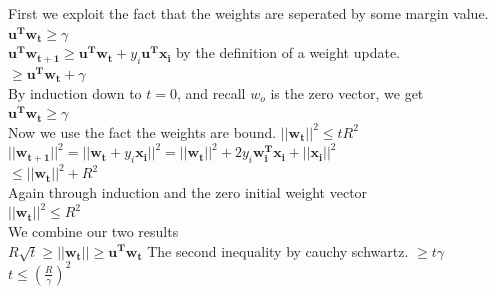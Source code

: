 \documentclass{article}
\begin{document}
\begin{itemize}
\begin{itemize}
	\begin{center}
	First we exploit the fact that the weights are seperated by some margin value. $\mathbf{u^T}\mathbf{w_t} \geq \gamma$\\
	$\mathbf{u^T}\mathbf{w_{t+1}} \geq \mathbf{u^T}\mathbf{w_t} + y_i\mathbf{u^T}\mathbf{x_i}$ by the definition of a weight update.\\
	$\geq \mathbf{u^T}\mathbf{w_t} + \gamma $\\
	By induction down to $t=0$, and recall $w_o$ is the zero vector, we get\\
	$\mathbf{u^T}\mathbf{w_t} \geq \gamma$\\
	Now we use the fact the weights are bound. $||\mathbf{w_t}||^2 \leq tR^2$ \\
	$||\mathbf{w_{t+1}}||^2 = ||\mathbf{w_t} +y_i\mathbf{x_i}||^2 = ||\mathbf{w_t}||^2 + 2y_i\mathbf{w_{i}^{T}}\mathbf{x_i} + ||\mathbf{x_i}||^2$\\
	$\leq ||\mathbf{w_t}||^2 + R^2$\\
	Again through induction and the zero initial weight vector\\
	$||\mathbf{w_t}||^2 \leq R^2$\\
	We combine our two results\\
	$R\sqrt{t} \geq ||\mathbf{w_t}|| \geq \mathbf{u^Tw_t}$ The second inequality by cauchy schwartz.
	$\geq t\gamma$\\
	$t\leq (\frac{R}{\gamma})^2$
	

\end{center}
\end{itemize}
\end{itemize}
\end{document}
